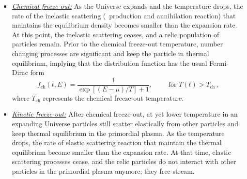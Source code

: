 \begin{itemize}
\item \underline{\it Chemical freeze-out:\/} 
As the Universe expands and the temperature drops, the rate of the inelastic scattering (\eg\ production and annihilation reaction) that maintains the equilibrium density becomes smaller than the expansion rate. At this point, the inelastic scattering ceases, and a relic population of particles remain. Prior to the chemical freeze-out temperature, number changing processes are significant and keep the particle in thermal equilibrium, implying that the distribution function has the usual Fermi-Dirac form 
\begin{equation}\label{equilibrium}
f_\mathrm{ch}(t,E)=\frac{1}{\exp[(E-\mu)/T]+1},\qquad \text{ for } T(t)> T_\mathrm{ch}
\,,
\end{equation}
where $T_\mathrm{ch}$ represents the chemical freeze-out temperature. \\[-0.2cm]
%
\item \underline{\it Kinetic freeze-out:\/}
After chemical freeze-out, at yet lower temperature in an expanding Universe particles still scatter elastically from other particles and keep thermal equilibrium in the primordial plasma. As the temperature drops, the rate of elastic scattering reaction that maintain the thermal equilibrium become smaller than the expansion rate. At that time, elastic scattering processes cease, and the relic particles do not interact with other particles in the primordial plasma anymore; they free-stream. 


\end{itemize}
